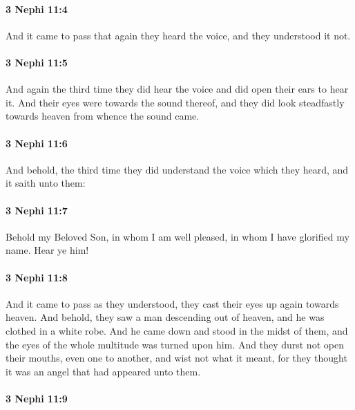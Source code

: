 		\paragraph{3 Nephi 11:4} %
			\label{3NEPHI-11-4}

			And it came to pass that again they heard the voice,
			and they understood it not.

		\paragraph{3 Nephi 11:5} %
			\label{3NEPHI-11-5}

			And again the third time they did hear the voice and did open their ears to hear it.
			And their eyes were towards the sound thereof,
			and they did look steadfastly towards heaven from whence the sound came.

		\paragraph{3 Nephi 11:6} %
			\label{3NEPHI-11-6}

			And behold, the third time they did understand the voice which they heard,
			and it saith unto them:

		\paragraph{3 Nephi 11:7} %
			\label{3NEPHI-11-7}

			Behold my Beloved Son, in whom I am well pleased,
			in whom I have glorified my name.
			Hear ye him!

		\paragraph{3 Nephi 11:8} %
			\label{3NEPHI-11-8}

			And it came to pass as they understood,
			they cast their eyes up again towards heaven.
			And behold, they saw a man descending out of heaven,
			and he was clothed in a white robe.
			And he came down and stood in the midst of them,
			and the eyes of the whole multitude was turned upon him.
			And they durst not open their mouths, even one to another,
			and wist not what it meant,
			for they thought it was an angel that had appeared unto them.

		\paragraph{3 Nephi 11:9} %
			\label{3NEPHI-11-9}

